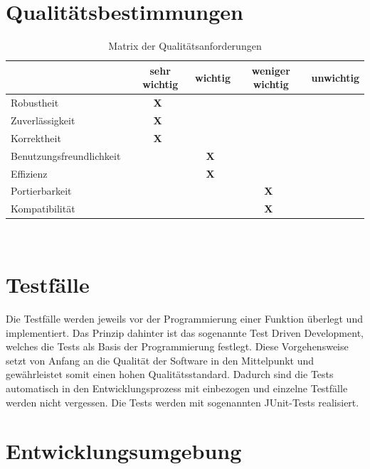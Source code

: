 \documentclass[12pt,oneside,a4paper,bibtotoc,liststotoc,pointlessnumbers]{scrartcl}
\begin{document}
\newpage
\section{Qualitätsbestimmungen}

\begin{table}[h]							
\begin{center}
 \begin{tabular}{l|c|c|c|c}
  ~ & sehr wichtig & wichtig & weniger wichtig & unwichtig\\
  \hline \hline
  Robustheit~ & \textbf{X}~ &  ~ ~ ~ &  ~ ~ ~ &  ~ ~ ~ \\
  \hline
  Zuverlässigkeit~ & \textbf{X}~ &  ~ ~ ~ &  ~ ~ ~ &  ~ ~ ~ \\
  \hline
  Korrektheit~ & \textbf{X}~ &  ~ ~ ~ &  ~ ~ ~ &  ~ ~ ~ \\
  \hline
  Benutzungsfreundlichkeit~ &  ~ ~ ~ & \textbf{X}~ &  ~ ~ ~ &  ~ ~ ~ \\
  \hline
  Effizienz~ &  ~ ~ ~ & \textbf{X}~ &  ~ ~ ~ &  ~ ~ ~ \\
  \hline
  Portierbarkeit~ &  ~ ~ ~ &  ~ ~ ~ & \textbf{X}~ &  ~ ~ ~ \\
  \hline
  Kompatibilität~ &  ~ ~ ~ &  ~ ~ ~ & \textbf{X}~ &  ~ ~ ~ \\
 \end{tabular}
\end{center}
\caption{Matrix der Qualitätsanforderungen}									%
\label{fig:LogoGD}												%
\end{table}


\
\newpage
\section{Testfälle}
Die Testfälle werden jeweils vor der Programmierung einer Funktion überlegt und implementiert. Das Prinzip dahinter ist das sogenannte
Test Driven Development, welches die Tests als Basis der Programmierung festlegt. Diese Vorgehensweise setzt von Anfang an die Qualität
der Software in den Mittelpunkt und gewährleistet somit einen hohen Qualitätsstandard. Dadurch sind die Tests automatisch in den 
Entwicklungsprozess mit einbezogen und einzelne Testfälle werden nicht vergessen. Die Tests werden mit sogenannten JUnit-Tests realisiert.
\newpage
\section{Entwicklungsumgebung}
\end{document}

